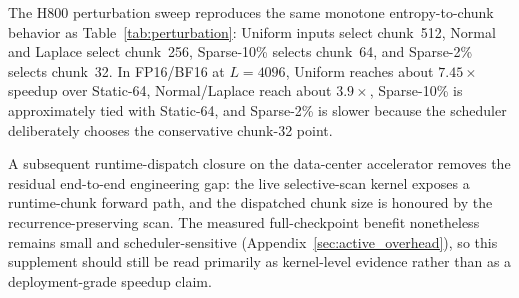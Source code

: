 The H800 perturbation sweep reproduces the same monotone entropy-to-chunk behavior as Table~\ref{tab:perturbation}: Uniform inputs select chunk~512, Normal and Laplace select chunk~256, Sparse-10\% selects chunk~64, and Sparse-2\% selects chunk~32. In FP16/BF16 at $L{=}4096$, Uniform reaches about $7.45\times$ speedup over Static-64, Normal/Laplace reach about $3.9\times$, Sparse-10\% is approximately tied with Static-64, and Sparse-2\% is slower because the scheduler deliberately chooses the conservative chunk-32 point.

A subsequent runtime-dispatch closure on the data-center accelerator removes the residual end-to-end engineering gap: the live selective-scan kernel exposes a runtime-chunk forward path, and the dispatched chunk size is honoured by the recurrence-preserving scan. The measured full-checkpoint benefit nonetheless remains small and scheduler-sensitive (Appendix~\ref{sec:active_overhead}), so this supplement should still be read primarily as kernel-level evidence rather than as a deployment-grade speedup claim.

